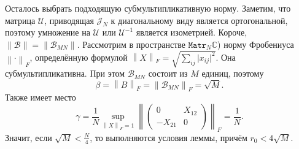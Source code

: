 Осталось выбрать подходящую субмультипликативную норму.
Заметим, что матрица \( \mathcal{U} \),
приводящая \( \mathcal{J}_N \) к диагональному виду
является ортогональной,
поэтому умножение на \( \mathcal{U} \) или \(\mathcal{U}^{-1}\)
является изометрией.
Короче, \( \|\mathcal{B}\|=\|\mathscr{B}_{MN}\| \).
Рассмотрим в пространстве \( \mathtt{Matr}_{N}\mathbb{C} \))
норму Фробениуса \( {\left\|\cdot\right\|}_{F} \),
определённую формулой
\( {\left\|X\right\|}_{F} = \sqrt{\sum_{ij} \lvert x_{ij}\rvert^2}. \)
Она субмультипликативна.
При этом
\( \mathscr{B}_{MN} \) состоит из \( M \) единиц, поэтому
\[
    \beta = {\left\|B\right\|}_{F} =
    {\left\|\mathscr{B}_{MN}\right\|}_{F} = \sqrt{M}.
    \]
Также имеет место
\[ \gamma = \frac1N
            \sup_{{\left\|X\right\|}_{F}=1}{\left\|\begin{pmatrix}0 & X_{12} \\ -X_{21} & 0\end{pmatrix}\right\|}_{F}
          = \frac1N.
    \]
Значит, если
\( \sqrt{M} < \frac{N}{4} \),
то выполняются условия леммы,
причём \( r_0 < 4\sqrt{M} \).
